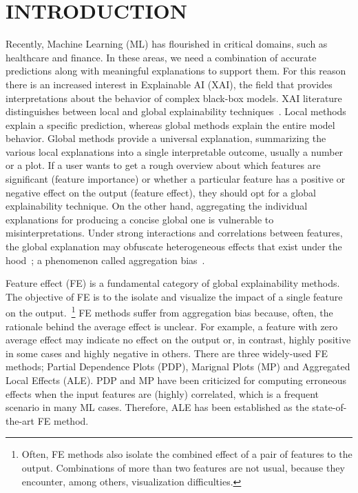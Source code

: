 \documentclass[twoside]{article}
\begin{document}
\section{INTRODUCTION}

Recently, Machine Learning (ML) has flourished in critical domains,
such as healthcare and finance. In these areas, we need a combination
of accurate predictions along with meaningful explanations to support
them. For this reason there is an increased interest in Explainable AI
(XAI), the field that provides interpretations about the behavior of
complex black-box models. XAI literature distinguishes between local
and global explainability
techniques~\citep{Molnar2020interpretable}. Local methods explain a
specific prediction, whereas global methods explain the entire model
behavior. Global methods provide a universal explanation, summarizing
the various local explanations into a single interpretable outcome,
usually a number or a plot. If a user wants to get a rough overview
about which features are significant (feature importance) or whether a
particular feature has a positive or negative effect on the output
(feature effect), they should opt for a global explainability
technique. On the other hand, aggregating the individual explanations
for producing a concise global one is vulnerable to
misinterpretations. Under strong interactions and correlations between
features, the global explanation may obfuscate heterogeneous effects
that exist under the hood~\citep{herbinger2022repid}; a phenomenon
called aggregation bias~\citep{mehrabi2021survey}.

Feature effect (FE) \citep{Gromping2020MAEP} is a fundamental category
of global explainability methods. The objective of FE is to the
isolate and visualize the impact of a single feature on the
output.~\footnote{Often, FE methods also isolate the combined effect
  of a pair of features to the output. Combinations of more than two
  features are not usual, because they encounter, among others,
  visualization difficulties.} FE methods suffer from aggregation bias
because, often, the rationale behind the average effect is
unclear. For example, a feature with zero average effect may indicate
no effect on the output or, in contrast, highly positive in some cases
and highly negative in others. There are three widely-used FE methods;
Partial Dependence Plots (PDP)\citep{friedman2001greedy}, Marignal
Plots (MP)\citep{apley2020visualizing} and Aggregated Local Effects
(ALE)\citep{apley2020visualizing}. PDP and MP have been criticized for
computing erroneous effects when the input features are (highly)
correlated, which is a frequent scenario in many ML cases. Therefore,
ALE has been established as the state-of-the-art FE method.
\end{document}
